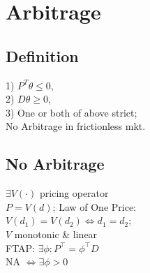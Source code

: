 \section{Arbitrage}
	\subsection*{Definition}
	1) $P^{T}\theta\leq 0$,\\
	2) $D\theta\geq 0$,\\
	3) One or both of above strict;\\
	No Arbitrage in frictionless mkt.
	
	\subsection*{No Arbitrage}
	$\exists V\left(\cdot\right)$ pricing operator\\
	$P = V(d)$; Law of One Price:\\
	$V\left(d_{1}\right) = V\left(d_{2}\right)\iff d_{1} = d_{2}$;\\
	$V$ monotonic \& linear\\
	FTAP: $\exists\phi: P^{\intercal} = \phi^{\intercal}D$\\
	NA $\iff\exists\phi > 0$
	
	